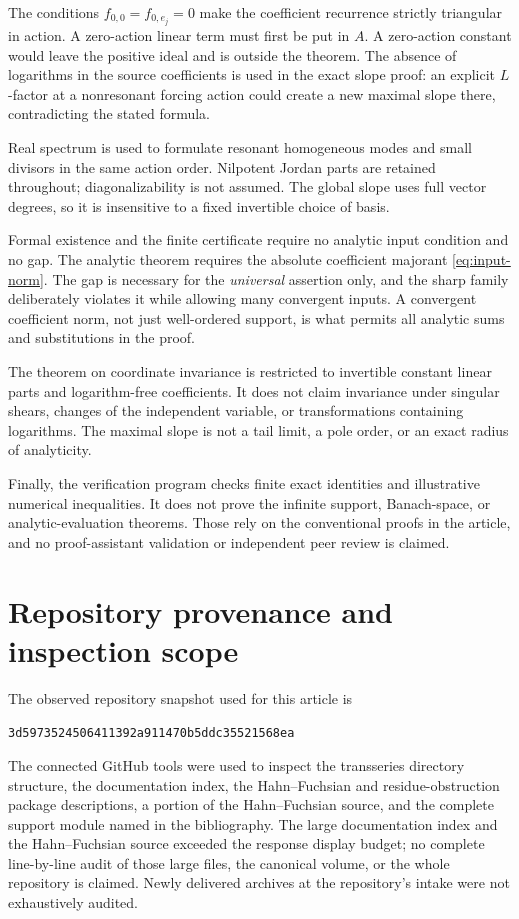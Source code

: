 \documentclass[11pt,a4paper]{article}
\numberwithin{equation}{section}
\theoremstyle{definition}
\theoremstyle{remark}
\newcommand{\snap}{\texttt{3d5973524506411392a911470b5ddc35521568ea}}
\begin{document}
The conditions \(f_{0,0}=f_{0,e_j}=0\) make the coefficient recurrence
strictly triangular in action. A zero-action linear term must first
be put in \(A\). A zero-action constant would leave the positive
ideal and is outside the theorem. The absence of logarithms in the
source coefficients is used in the exact slope proof: an explicit
\(L\)-factor at a nonresonant forcing action could create a new
maximal slope there, contradicting the stated formula.

Real spectrum is used to formulate resonant homogeneous modes and
small divisors in the same action order. Nilpotent Jordan parts are
retained throughout; diagonalizability is not assumed. The global
slope uses full vector degrees, so it is insensitive to a fixed
invertible choice of basis.

Formal existence and the finite certificate require no analytic
input condition and no gap. The analytic theorem requires the
absolute coefficient majorant \eqref{eq:input-norm}. The gap is
necessary for the \emph{universal} assertion only, and the sharp
family deliberately violates it while allowing many convergent
inputs. A convergent coefficient norm, not just well-ordered support,
is what permits all analytic sums and substitutions in the proof.

The theorem on coordinate invariance is restricted to invertible
constant linear parts and logarithm-free coefficients. It does not
claim invariance under singular shears, changes of the independent
variable, or transformations containing logarithms. The maximal
slope is not a tail limit, a pole order, or an exact radius of
analyticity.

Finally, the verification program checks finite exact identities and
illustrative numerical inequalities. It does not prove the infinite
support, Banach-space, or analytic-evaluation theorems. Those rely on
the conventional proofs in the article, and no proof-assistant
validation or independent peer review is claimed.

\section{Repository provenance and inspection scope}
\label{app:provenance}

The observed repository snapshot used for this article is
\begin{center}\snap\end{center}
The connected GitHub tools were used to inspect the
transseries directory structure, the documentation index, the
Hahn--Fuchsian and residue-obstruction package descriptions, a
portion of the Hahn--Fuchsian source, and the complete support
module named in the bibliography. The large documentation index
and the Hahn--Fuchsian source exceeded the response display budget;
no complete line-by-line audit of those large files, the canonical
volume, or the whole repository is claimed. Newly delivered
archives at the repository's intake were not exhaustively audited.
\end{document}
